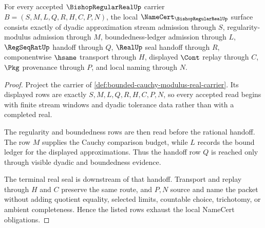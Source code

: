 \begin{theorem}
\label{thm:bounded-cauchy-modulus-real-namecert-obligations}
For every accepted $\BishopRegularRealUp$ carrier $B=(S,M,L,Q,R,H,C,P,N)$, the local $\NameCert_{\BishopRegularRealUp}$ surface consists exactly of dyadic approximation stream admission through $S$, regularity-modulus admission through $M$, boundedness-ledger admission through $L$, $\RegSeqRatUp$ handoff through $Q$, $\RealUp$ seal handoff through $R$, componentwise $\hsame$ transport through $H$, displayed $\Cont$ replay through $C$, $\Pkg$ provenance through $P$, and local naming through $N$.
\end{theorem}
\begin{proof}
Project the carrier of \autoref{def:bounded-cauchy-modulus-real-carrier}. Its displayed rows are exactly $S,M,L,Q,R,H,C,P,N$, so every accepted read begins with finite stream windows and dyadic tolerance data rather than with a completed real.

The regularity and boundedness rows are then read before the rational handoff. The row $M$ supplies the Cauchy comparison budget, while $L$ records the bound ledger for the displayed approximations. Thus the handoff row $Q$ is reached only through visible dyadic and boundedness evidence.

The terminal real seal is downstream of that handoff. Transport and replay through $H$ and $C$ preserve the same route, and $P,N$ source and name the packet without adding quotient equality, selected limits, countable choice, trichotomy, or ambient completeness. Hence the listed rows exhaust the local NameCert obligations.
\end{proof}

